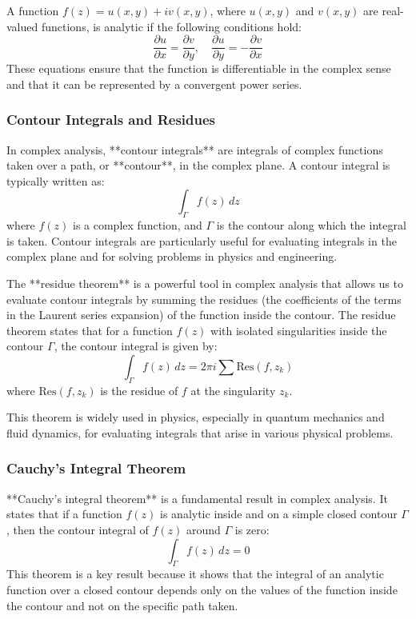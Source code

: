 \documentclass{article}
\begin{document}
A function \( f(z) = u(x, y) + iv(x, y) \), where \( u(x, y) \) and \( v(x, y) \) are real-valued functions, is analytic if the following conditions hold:
\[
\frac{\partial u}{\partial x} = \frac{\partial v}{\partial y}, \quad \frac{\partial u}{\partial y} = -\frac{\partial v}{\partial x}
\]
These equations ensure that the function is differentiable in the complex sense and that it can be represented by a convergent power series.

\subsubsection*{Contour Integrals and Residues}

In complex analysis, **contour integrals** are integrals of complex functions taken over a path, or **contour**, in the complex plane. A contour integral is typically written as:
\[
\int_{\Gamma} f(z) \, dz
\]
where \( f(z) \) is a complex function, and \( \Gamma \) is the contour along which the integral is taken. Contour integrals are particularly useful for evaluating integrals in the complex plane and for solving problems in physics and engineering.

The **residue theorem** is a powerful tool in complex analysis that allows us to evaluate contour integrals by summing the residues (the coefficients of the terms in the Laurent series expansion) of the function inside the contour. The residue theorem states that for a function \( f(z) \) with isolated singularities inside the contour \( \Gamma \), the contour integral is given by:
\[
\int_{\Gamma} f(z) \, dz = 2\pi i \sum \text{Res}(f, z_k)
\]
where \( \text{Res}(f, z_k) \) is the residue of \( f \) at the singularity \( z_k \).

This theorem is widely used in physics, especially in quantum mechanics and fluid dynamics, for evaluating integrals that arise in various physical problems.

\subsubsection*{Cauchy's Integral Theorem}

**Cauchy’s integral theorem** is a fundamental result in complex analysis. It states that if a function \( f(z) \) is analytic inside and on a simple closed contour \( \Gamma \), then the contour integral of \( f(z) \) around \( \Gamma \) is zero:
\[
\int_{\Gamma} f(z) \, dz = 0
\]
This theorem is a key result because it shows that the integral of an analytic function over a closed contour depends only on the values of the function inside the contour and not on the specific path taken.
\end{document}
